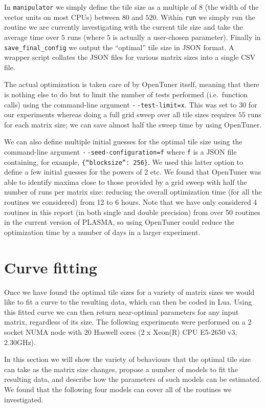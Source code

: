 \documentclass[a4paper,12pt]{article}
\begin{document}
In \texttt{manipulator} we simply define the tile size as a
multiple of $8$ (the width of the vector units on most CPUs)
between $80$ and $520$.
Within \texttt{run} we simply run the routine we are currently
investigating with the current tile size and take the average time
over $5$ runs (where $5$ is actually a user-chosen parameter).
Finally in \texttt{save\_final\_config} we output the
``optimal'' tile size in JSON format.
A wrapper script collates the JSON files for various matrix sizes
into a single CSV file.

The actual optimization is taken care of by OpenTuner itself,
meaning that there is nothing else to do but to limit
the number of tests performed (i.e.\ function calls)
using the command-line argument
\texttt{-$\,$-test-limit=x}.
This was set to $30$ for our experiments whereas doing a full
grid sweep over all tile sizes requires $55$ runs for each matrix size;
we can save almost half the sweep time by using OpenTuner.

We can also define multiple initial guesses for the optimal
tile size using the command-line argument
\texttt{-$\,$-seed-configuration=f} where \texttt{f} is a JSON
file containing, for example, \texttt{\{``blocksize'': 256\}}.
We used this latter option to define a few initial guesses
for the powers of 2 etc.
We found that OpenTuner was able to identify maxima
close to those provided by a grid sweep with half the number of runs
per matrix size:
reducing the overall optimization time (for all the routines we considered)
from 12 to 6 hours.
Note that we have only considered 4 routines in this report
(in both single and double precision)
from over 50 routines in the current version of PLASMA,
so using OpenTuner could reduce the optimization time by a
number of days in a larger experiment.

\section{Curve fitting}
\label{sec.curvefitting}
Once we have found the optimal tile sizes for a variety of matrix
sizes we would like to fit a curve to the resulting data,
which can then be coded in Lua.
Using this fitted curve we can then return near-optimal
parameters for any input matrix,
regardless of its size.
The following experiments were performed
on a 2 socket NUMA node with
20 Haswell cores (2 x Xeon(R) CPU E5-2650 v3, 2.30GHz).

In this section we will show the variety of behaviours
that the optimal tile size can take as the matrix size changes,
propose a number of models to fit the resulting data,
and describe how the parameters of such models can be estimated.
We found that the following four models can cover all
of the routines we investigated.
\end{document}
